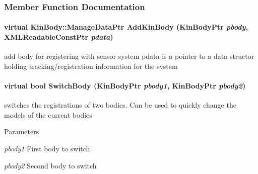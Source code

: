 \subsubsection{Member Function Documentation}
\hypertarget{classOpenRAVE_1_1SensorSystemBase_a97c5f9efa14de77c511e1c83048ada63}{
\paragraph[{AddKinBody}]{\setlength{\rightskip}{0pt plus 5cm}virtual KinBody::ManageDataPtr AddKinBody (KinBodyPtr {\em pbody}, \/  XMLReadableConstPtr {\em pdata})}\hfill}
\label{classOpenRAVE_1_1SensorSystemBase_a97c5f9efa14de77c511e1c83048ada63}
add body for registering with sensor system pdata is a pointer to a data structor holding tracking/registration information for the system \hypertarget{classOpenRAVE_1_1SensorSystemBase_afbf8616af8f2414b866e5ce416072af4}{
\paragraph[{SwitchBody}]{\setlength{\rightskip}{0pt plus 5cm}virtual bool SwitchBody (KinBodyPtr {\em pbody1}, \/  KinBodyPtr {\em pbody2})}\hfill}
\label{classOpenRAVE_1_1SensorSystemBase_afbf8616af8f2414b866e5ce416072af4}
switches the registrations of two bodies. Can be used to quickly change the models of the current bodies 
\begin{DoxyParams}{Parameters}
\item[{\em pbody1}]First body to switch \item[{\em pbody2}]Second body to switch \end{DoxyParams}
